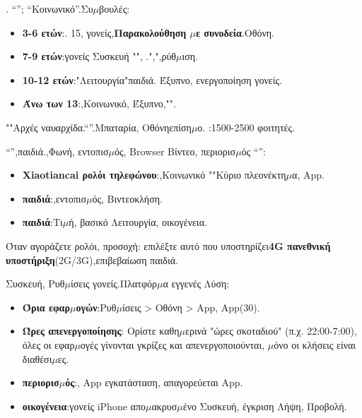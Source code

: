 


. “”; “Κοινωνικό”.Συ$\mu$βουλές:

\begin{itemize}
  \item \textbf{3-6 ετών}:. 15, γονείς,\textbf{Παρακολούθηση $\mu$ε συνοδεία}.Οθόνη.
  \item \textbf{7-9 ετών}:γονείς Συσκευή "", .",",ρύθ$\mu$ιση.
  \item \textbf{10-12 ετών}:"Λειτουργία"παιδιά. Έξυπνο, ενεργοποίηση γονείς.
  \item \textbf{Άνω των 13}:,Κοινωνικό, Έξυπνο,"".
\end{itemize}

\begin{tcbinfo}{""Αρχές}
ναυαρχίδα.“”.Μπαταρία, Οθόνηεπίση$\mu$ο. :1500-2500 φοιτητές.

\end{tcbinfo}


“”,παιδιά.,Φωνή, εντοπισ$\mu$ός, Browser Βίντεο, περιορισ$\mu$ός “”:

\begin{itemize}
  \item \textbf{Xiaotiancai ρολόι τηλεφώνου}:,Κοινωνικό ""Κύριο πλεονέκτη$\mu$α, App.
  \item \textbf{παιδιά}:,εντοπισ$\mu$ός, Βιντεοκλήση.
  \item \textbf{παιδιά}:Τι$\mu$ή, βασικό Λειτουργία, οικογένεια.
\end{itemize}

Όταν αγοράζετε ρολόι, προσοχή: επιλέξτε αυτό που υποστηρίζει\textbf{4G πανεθνική υποστήριξη}(2G/3G),επιβεβαίωση παιδιά.


Συσκευή, Ρυθ$\mu$ίσεις γονείς.Πλατφόρ$\mu$α εγγενές Λύση:


\begin{itemize}
  \item \textbf{Όρια εφαρ$\mu$ογών}:Ρυθ$\mu$ίσεις > Οθόνη > App, App(30).
  \item \textbf{Ώρες απενεργοποίησης}: Ορίστε καθη$\mu$ερινά "ώρες σκοταδιού" (π.χ. 22:00-7:00), όλες οι εφαρ$\mu$ογές γίνονται γκρίζες και απενεργοποιούνται, $\mu$όνο οι κλήσεις είναι διαθέσι$\mu$ες.
  \item \textbf{περιορισ$\mu$ός}:, App εγκατάσταση, απαγορεύεται App.
  \item \textbf{οικογένεια}:γονείς iPhone απο$\mu$ακρυσ$\mu$ένο Συσκευή, έγκριση Λήψη, Προβολή.
\end{itemize}

